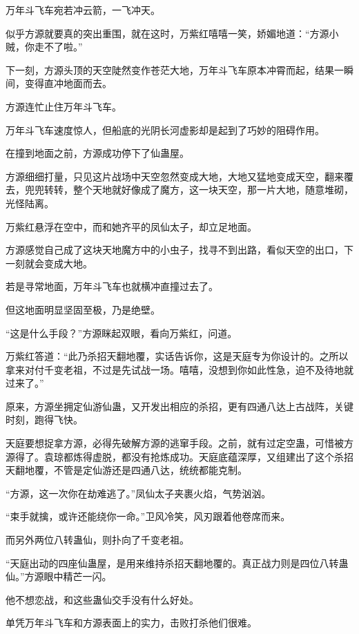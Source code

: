 
\begin{this_body}

万年斗飞车宛若冲云箭，一飞冲天。

似乎方源就要真的突出重围，就在这时，万紫红嘻嘻一笑，娇媚地道：“方源小贼，你走不了啦。”

下一刻，方源头顶的天空陡然变作苍茫大地，万年斗飞车原本冲霄而起，结果一瞬间，变得直冲地面而去。

方源连忙止住万年斗飞车。

万年斗飞车速度惊人，但船底的光阴长河虚影却是起到了巧妙的阻碍作用。

在撞到地面之前，方源成功停下了仙蛊屋。

方源细细打量，只见这片战场中天空忽然变成大地，大地又猛地变成天空，翻来覆去，兜兜转转，整个天地就好像成了魔方，这一块天空，那一片大地，随意堆砌，光怪陆离。

万紫红悬浮在空中，而和她齐平的凤仙太子，却立足地面。

方源感觉自己成了这块天地魔方中的小虫子，找寻不到出路，看似天空的出口，下一刻就会变成大地。

若是寻常地面，万年斗飞车也就横冲直撞过去了。

但这地面明显坚固至极，乃是绝壁。

“这是什么手段？”方源眯起双眼，看向万紫红，问道。

万紫红答道：“此乃杀招天翻地覆，实话告诉你，这是天庭专为你设计的。之所以拿来对付千变老祖，不过是先试战一场。嘻嘻，没想到你如此性急，迫不及待地就过来了。”

原来，方源坐拥定仙游仙蛊，又开发出相应的杀招，更有四通八达上古战阵，关键时刻，跑得飞快。

天庭要想捉拿方源，必得先破解方源的逃窜手段。之前，就有过定空蛊，可惜被方源得了。袁琼都炼得虚脱，都没有抢炼成功。天庭底蕴深厚，又组建出了这个杀招天翻地覆，不管是定仙游还是四通八达，统统都能克制。

“方源，这一次你在劫难逃了。”凤仙太子夹裹火焰，气势汹汹。

“束手就擒，或许还能绕你一命。”卫风冷笑，风刃跟着他卷席而来。

而另外两位八转蛊仙，则扑向了千变老祖。

“天庭出动的四座仙蛊屋，是用来维持杀招天翻地覆的。真正战力则是四位八转蛊仙。”方源眼中精芒一闪。

他不想恋战，和这些蛊仙交手没有什么好处。

单凭万年斗飞车和方源表面上的实力，击败打杀他们很难。


\end{this_body}
